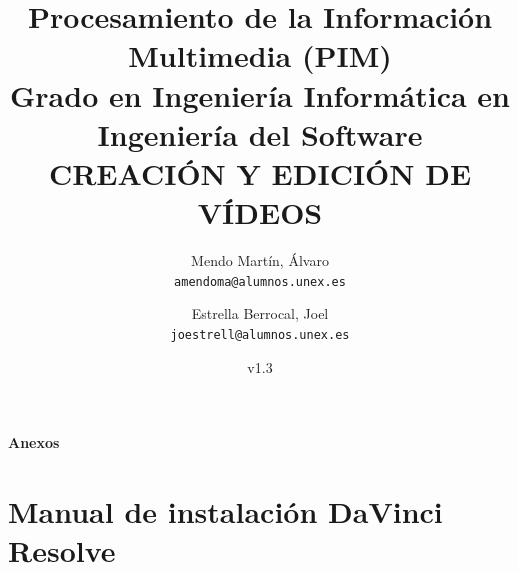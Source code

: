 \documentclass[12pt]{report}
\title{ {\normalsize \bf Procesamiento de la Información Multimedia (PIM) \\ \vspace{-1.25em} 
Grado en Ingeniería Informática en Ingeniería del Software} \\ \vspace{1.25em}
        {\Huge \bf CREACIÓN Y EDICIÓN DE VÍDEOS}
      }
\author{
  Mendo Martín, Álvaro\\
  \texttt{amendoma@alumnos.unex.es}
  \and
  Estrella Berrocal, Joel\\
  \texttt{joestrell@alumnos.unex.es}
}
\date{v1.3}
\begin{document}
    \maketitle

    
    \newpage

    \thispagestyle{fancy}
    \tableofcontents
    \newpage
    
    
    
    
    
    
    

    

    

    


  \cleardoublepage
  \thispagestyle{empty}

  \vspace*{\fill}
  \begin{center}
      \Huge \textbf{Anexos}
  \end{center}
  \vspace*{\fill}

  \cleardoublepage

  \chapter*{Manual de instalación DaVinci Resolve}
  \label{chapter:manual-instalacion}

  

    
\end{document}
